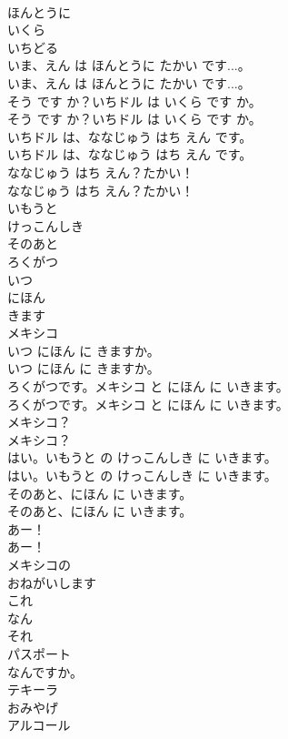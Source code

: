 \documentclass[8pt]{extreport}
\begin{document}
\begin{CJK}{UTF8}{min}
\\	ほんとうに
\\	いくら
\\	いちどる
\\	いま、えん は ほんとうに たかい です...。	
\\	いま、えん は ほんとうに たかい です...。 
\\	そう です か？いちドル は いくら です か。	
\\	そう です か？いちドル は いくら です か。 
\\	いちドル は、ななじゅう はち えん です。	
\\	いちドル は、ななじゅう はち えん です。 
\\	ななじゅう はち えん？たかい！	
\\	ななじゅう はち えん？たかい！ 
\\	いもうと
\\	けっこんしき
\\	そのあと
\\	ろくがつ
\\	いつ
\\	にほん
\\	きます
\\	メキシコ
\\	いつ にほん に きますか。	
\\	いつ にほん に きますか。 
\\	ろくがつです。メキシコ と にほん に いきます。	
\\	ろくがつです。メキシコ と にほん に いきます。 
\\	メキシコ？	
\\	メキシコ？ 
\\	はい。いもうと の けっこんしき に いきます。	
\\	はい。いもうと の けっこんしき に いきます。 
\\	そのあと、にほん に いきます。	
\\	そのあと、にほん に いきます。 
\\	あー！	
\\	あー！ 
\\	メキシコの
\\	おねがいします
\\	これ
\\	なん
\\	それ
\\	パスポート
\\	なんですか。
\\	テキーラ
\\	おみやげ
\\	アルコール

\end{CJK}
\end{document}
